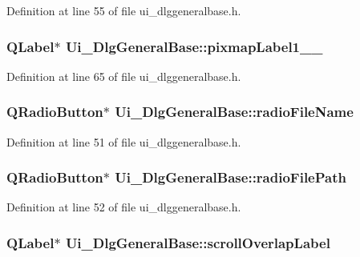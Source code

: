 Definition at line 55 of file ui\+\_\+dlggeneralbase.\+h.

\hypertarget{classUi__DlgGeneralBase_abf82683d25a444dcffa83917ac9f75a4}{
\subsubsection[{pixmap\+Label1\+\_\+2\+\_\+2}]{\setlength{\rightskip}{0pt plus 5cm}Q\+Label$\ast$ Ui\+\_\+\+Dlg\+General\+Base\+::pixmap\+Label1\+\_\+\_}}\label{classUi__DlgGeneralBase_abf82683d25a444dcffa83917ac9f75a4}


Definition at line 65 of file ui\+\_\+dlggeneralbase.\+h.

\hypertarget{classUi__DlgGeneralBase_a40cff822b48d52cb4524aa842477519a}{
\subsubsection[{radio\+File\+Name}]{\setlength{\rightskip}{0pt plus 5cm}Q\+Radio\+Button$\ast$ Ui\+\_\+\+Dlg\+General\+Base\+::radio\+File\+Name}}\label{classUi__DlgGeneralBase_a40cff822b48d52cb4524aa842477519a}


Definition at line 51 of file ui\+\_\+dlggeneralbase.\+h.

\hypertarget{classUi__DlgGeneralBase_ac39d9951537fef09370ebbbf6bf52d44}{
\subsubsection[{radio\+File\+Path}]{\setlength{\rightskip}{0pt plus 5cm}Q\+Radio\+Button$\ast$ Ui\+\_\+\+Dlg\+General\+Base\+::radio\+File\+Path}}\label{classUi__DlgGeneralBase_ac39d9951537fef09370ebbbf6bf52d44}


Definition at line 52 of file ui\+\_\+dlggeneralbase.\+h.

\hypertarget{classUi__DlgGeneralBase_afd8162f00985b598c6b44fea18d59add}{
\subsubsection[{scroll\+Overlap\+Label}]{\setlength{\rightskip}{0pt plus 5cm}Q\+Label$\ast$ Ui\+\_\+\+Dlg\+General\+Base\+::scroll\+Overlap\+Label}}\label{classUi__DlgGeneralBase_afd8162f00985b598c6b44fea18d59add}


